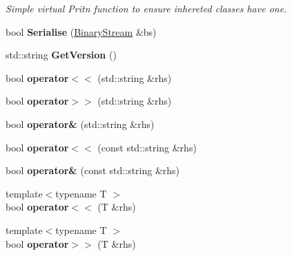 \begin{DoxyCompactItemize}
\begin{DoxyCompactList}\small\item\em Simple virtual Pritn function to ensure inhereted classes have one. \end{DoxyCompactList}\item 
\hypertarget{classBinaryStream_a4f5fe9de799575950baba7d9a5ab68b9}{bool {\bfseries Serialise} (\hyperlink{classBinaryStream}{Binary\-Stream} \&bs)}\label{classBinaryStream_a4f5fe9de799575950baba7d9a5ab68b9}

\item 
\hypertarget{classBinaryStream_a855fa4cf9563eab19c5ac69b447da912}{std\-::string {\bfseries Get\-Version} ()}\label{classBinaryStream_a855fa4cf9563eab19c5ac69b447da912}

\item 
\hypertarget{classBinaryStream_a43f9922bf139ed387f8fce43ee5f6b63}{bool {\bfseries operator$<$$<$} (std\-::string \&rhs)}\label{classBinaryStream_a43f9922bf139ed387f8fce43ee5f6b63}

\item 
\hypertarget{classBinaryStream_a971f6d7c5938e646717dc9a8207f38ae}{bool {\bfseries operator$>$$>$} (std\-::string \&rhs)}\label{classBinaryStream_a971f6d7c5938e646717dc9a8207f38ae}

\item 
\hypertarget{classBinaryStream_a61181bd9b36486e7f400b81f9938297f}{bool {\bfseries operator\&} (std\-::string \&rhs)}\label{classBinaryStream_a61181bd9b36486e7f400b81f9938297f}

\item 
\hypertarget{classBinaryStream_a5d0d37a2b73f15728916429f8bb2caff}{bool {\bfseries operator$<$$<$} (const std\-::string \&rhs)}\label{classBinaryStream_a5d0d37a2b73f15728916429f8bb2caff}

\item 
\hypertarget{classBinaryStream_aad6800a1258f980a37e8f9e779cd293e}{bool {\bfseries operator\&} (const std\-::string \&rhs)}\label{classBinaryStream_aad6800a1258f980a37e8f9e779cd293e}

\item 
\hypertarget{classBinaryStream_ad0945749b4885fddf66a01903c8cbbfd}{{\footnotesize template$<$typename T $>$ }\\bool {\bfseries operator$<$$<$} (T \&rhs)}\label{classBinaryStream_ad0945749b4885fddf66a01903c8cbbfd}

\item 
\hypertarget{classBinaryStream_a94b63bf291fc3ffb1c7d4f2775d13375}{{\footnotesize template$<$typename T $>$ }\\bool {\bfseries operator$>$$>$} (T \&rhs)}\label{classBinaryStream_a94b63bf291fc3ffb1c7d4f2775d13375}


\end{DoxyCompactItemize}
